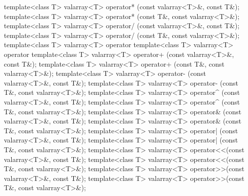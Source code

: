 %
%
%
%
%
%
%
%
%
%
%
%
%
%
%
%
%
%
%
%
\begin{itemdecl}
template<class T> valarray<T> operator* (const valarray<T>&, const T&);
template<class T> valarray<T> operator* (const T&, const valarray<T>&);
template<class T> valarray<T> operator/ (const valarray<T>&, const T&);
template<class T> valarray<T> operator/ (const T&, const valarray<T>&);
template<class T> valarray<T> operator%
template<class T> valarray<T> operator%
template<class T> valarray<T> operator+ (const valarray<T>&, const T&);
template<class T> valarray<T> operator+ (const T&, const valarray<T>&);
template<class T> valarray<T> operator- (const valarray<T>&, const T&);
template<class T> valarray<T> operator- (const T&, const valarray<T>&);
template<class T> valarray<T> operator^ (const valarray<T>&, const T&);
template<class T> valarray<T> operator^ (const T&, const valarray<T>&);
template<class T> valarray<T> operator& (const valarray<T>&, const T&);
template<class T> valarray<T> operator& (const T&, const valarray<T>&);
template<class T> valarray<T> operator| (const valarray<T>&, const T&);
template<class T> valarray<T> operator| (const T&, const valarray<T>&);
template<class T> valarray<T> operator<<(const valarray<T>&, const T&);
template<class T> valarray<T> operator<<(const T&, const valarray<T>&);
template<class T> valarray<T> operator>>(const valarray<T>&, const T&);
template<class T> valarray<T> operator>>(const T&, const valarray<T>&);
\end{itemdecl}

